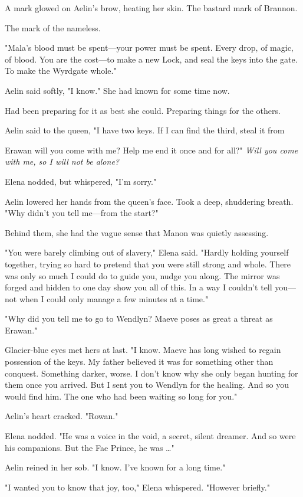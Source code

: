 A mark glowed on Aelin's brow, heating her skin. The bastard mark of Brannon.

The mark of the nameless.

"Mala's blood must be spent---your power must be spent. Every drop, of magic, of blood. You are the cost---to make a new Lock, and seal the keys into the gate. To make the Wyrdgate whole."

Aelin said softly, "I know." She had known for some time now.

Had been preparing for it as best she could. Preparing things for the others.

Aelin said to the queen, "I have two keys. If I can find the third, steal it from

Erawan  will you come with me? Help me end it once and for all?" \emph{Will you come with me, so I will not be alone?}

Elena nodded, but whispered, "I'm sorry."

Aelin lowered her hands from the queen's face. Took a deep, shuddering breath. "Why didn't you tell me---from the start?"

Behind them, she had the vague sense that Manon was quietly assessing.

"You were barely climbing out of slavery," Elena said. "Hardly holding yourself together, trying so hard to pretend that you were still strong and whole. There was only so much I could do to guide you, nudge you along. The mirror was forged and hidden to one day show you all of this. In a way I couldn't tell you---not when I could only manage a few minutes at a time."

"Why did you tell me to go to Wendlyn? Maeve poses as great a threat as Erawan."

Glacier-blue eyes met hers at last. "I know. Maeve has long wished to regain possession of the keys. My father believed it was for something other than conquest. Something darker, worse. I don't know why she only began hunting for them once you arrived. But I sent you to Wendlyn for the healing. And so you would  find him. The one who had been waiting so long for you."

Aelin's heart cracked. "Rowan."

Elena nodded. "He was a voice in the void, a secret, silent dreamer. And so were his companions. But the Fae Prince, he was \ldots"

Aelin reined in her sob. "I know. I've known for a long time."

"I wanted you to know that joy, too," Elena whispered. "However briefly."


